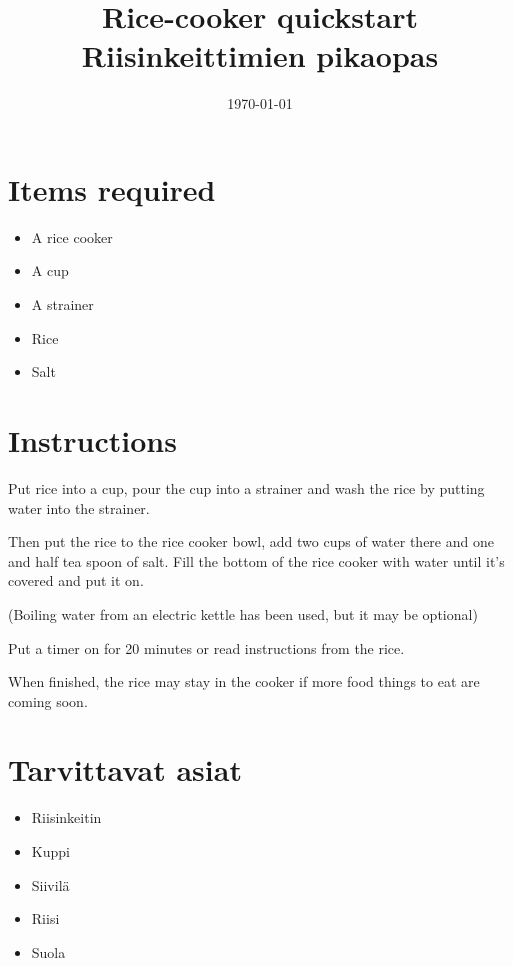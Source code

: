 \documentclass[a4paper,twocolumn]{artikel3}
\title{Rice-cooker quickstart\\Riisinkeittimien pikaopas}
\date{\today}
\begin{document}
\maketitle


\section*{Items required}

\begin{itemize}
\item A rice cooker
\item A cup
\item A strainer
\item Rice
\item Salt
\end{itemize}

\section*{Instructions}

Put rice into a cup, pour the cup into a strainer and wash the rice by
putting water into the strainer.

Then put the rice to the rice cooker bowl, add two cups of water there and
one and half tea spoon of salt. Fill the bottom of the rice cooker with
water until it's covered and put it on.

(Boiling water from an electric kettle has been used, but it may be
optional)

Put a timer on for 20 minutes or read instructions from the rice.

When finished, the rice may stay in the cooker if more food things to eat
are coming soon.


\newpage
{}

\section*{Tarvittavat asiat}

\begin{itemize}
\item Riisinkeitin
\item Kuppi
\item Siivilä
\item Riisi
\item Suola
\end{itemize}
\end{document}
